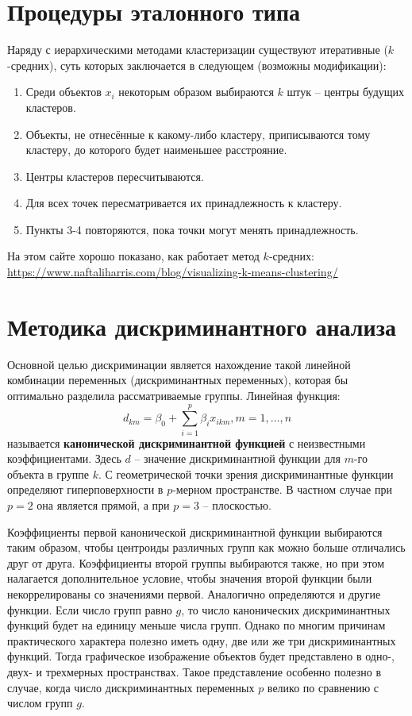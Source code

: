 \documentclass[a4paper, 12pt]{article}
\begin{document}
\section{Процедуры эталонного типа}
Наряду с иерархическими методами кластеризации существуют итеративные ($k$-средних), суть которых заключается в следующем (возможны модификации):
\begin{enumerate}
    \item Среди объектов $x_i$ некоторым образом выбираются $k$ штук -- центры будущих кластеров.
    \item Объекты, не отнесённые к какому-либо кластеру, приписываются тому кластеру, до которого будет наименьшее расстрояние.
    \item Центры кластеров пересчитываются.
    \item Для всех точек пересматривается их принадлежность к кластеру.
    \item Пункты 3-4 повторяются, пока точки могут менять принадлежность.
\end{enumerate}
На этом сайте хорошо показано, как работает метод $k$-средних: \url{https://www.naftaliharris.com/blog/visualizing-k-means-clustering/}

\section{Методика дискриминантного анализа}
Основной целью дискриминации является нахождение такой линейной комбинации переменных (дискриминантных переменных), которая бы оптимально разделила рассматриваемые группы. Линейная функция:
\begin{equation}
    d_{k m}=\beta_0 + \sum_{i=1}^p \beta_i x_{i k m}, m=1,\dots, n
\end{equation}
называется \textbf{канонической дискриминантной функцией}  с неизвестными коэффициентами. Здесь $d$ -- значение  дискриминантной функции для $m$-го объекта в группе $k$. С геометрической точки зрения дискриминантные функции определяют гиперповерхности в $p$-мерном пространстве. В частном случае при $p = 2$ она является прямой, а при $p = 3$ – плоскостью. 

Коэффициенты  первой канонической дискриминантной функции выбираются таким образом, чтобы центроиды различных групп как можно больше отличались друг от друга. Коэффициенты второй группы выбираются также, но при этом налагается дополнительное условие, чтобы значения второй функции были некоррелированы со значениями первой. Аналогично определяются и другие функции. Если число групп равно $g$, то число канонических дискриминантных функций будет на единицу меньше числа групп. Однако по многим причинам практического характера полезно иметь одну, две или же три дискриминантных функций. Тогда графическое изображение объектов будет представлено в одно-, двух- и трехмерных пространствах. Такое представление особенно полезно в случае, когда число дискриминантных переменных $p$ велико по сравнению с числом групп $g$.
\end{document}
